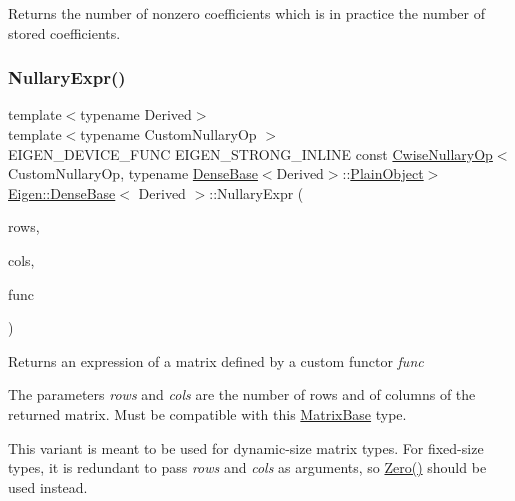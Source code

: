 \begin{DoxyReturn}{Returns}
the number of nonzero coefficients which is in practice the number of stored coefficients. 
\end{DoxyReturn}
\mbox{\label{class_eigen_1_1_dense_base_a3ea498fabfd5b313a643705813ee9ce5}} 
\subsubsection{\texorpdfstring{NullaryExpr()}{NullaryExpr()}\hspace{0.1cm}{\footnotesize\ttfamily [1/3]}}
{\footnotesize\ttfamily template$<$typename Derived$>$ \\
template$<$typename Custom\+Nullary\+Op $>$ \\
E\+I\+G\+E\+N\+\_\+\+D\+E\+V\+I\+C\+E\+\_\+\+F\+U\+NC E\+I\+G\+E\+N\+\_\+\+S\+T\+R\+O\+N\+G\+\_\+\+I\+N\+L\+I\+NE const \mbox{\hyperlink{class_eigen_1_1_cwise_nullary_op}{Cwise\+Nullary\+Op}}$<$Custom\+Nullary\+Op, typename \mbox{\hyperlink{class_eigen_1_1_dense_base}{Dense\+Base}}$<$Derived$>$\+::\mbox{\hyperlink{class_eigen_1_1_dense_base_aae45af9b5aca5a9caae98fd201f47cc4}{Plain\+Object}}$>$ \mbox{\hyperlink{class_eigen_1_1_dense_base}{Eigen\+::\+Dense\+Base}}$<$ Derived $>$\+::Nullary\+Expr (\begin{DoxyParamCaption}\item[{Index}]{rows,  }\item[{Index}]{cols,  }\item[{const Custom\+Nullary\+Op \&}]{func }\end{DoxyParamCaption})}

\begin{DoxyReturn}{Returns}
an expression of a matrix defined by a custom functor {\itshape func} 
\end{DoxyReturn}
The parameters {\itshape rows} and {\itshape cols} are the number of rows and of columns of the returned matrix. Must be compatible with this \mbox{\hyperlink{class_eigen_1_1_matrix_base}{Matrix\+Base}} type.

This variant is meant to be used for dynamic-\/size matrix types. For fixed-\/size types, it is redundant to pass {\itshape rows} and {\itshape cols} as arguments, so \mbox{\hyperlink{class_eigen_1_1_dense_base_a8c4be762b10041d64a2b2ce85bb14ba0}{Zero()}} should be used instead.

